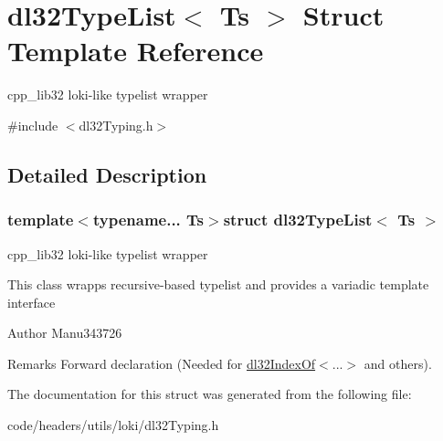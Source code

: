 \hypertarget{structdl32_type_list}{\section{dl32\-Type\-List$<$ Ts $>$ Struct Template Reference}
\label{structdl32_type_list}
}


cpp\-\_\-lib32 loki-\/like typelist wrapper  




{\ttfamily \#include $<$dl32\-Typing.\-h$>$}



\subsection{Detailed Description}
\subsubsection*{template$<$typename... Ts$>$struct dl32\-Type\-List$<$ Ts $>$}

cpp\-\_\-lib32 loki-\/like typelist wrapper 

This class wrapps recursive-\/based typelist and provides a variadic template interface

\begin{DoxyAuthor}{Author}
Manu343726
\end{DoxyAuthor}
\begin{DoxyRemark}{Remarks}
Forward declaration (Needed for \hyperlink{structdl32_index_of}{dl32\-Index\-Of}$<$...$>$ and others). 
\end{DoxyRemark}


The documentation for this struct was generated from the following file\-:\begin{DoxyCompactItemize}
\item 
code/headers/utils/loki/dl32\-Typing.\-h\end{DoxyCompactItemize}
